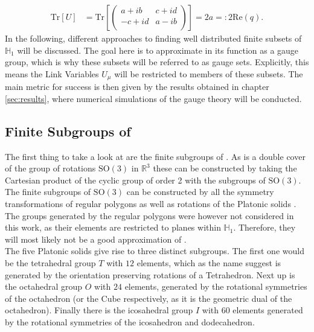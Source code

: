 \begin{align*}
 \mathrm{Tr}\left[ U \right] & = \mathrm{Tr}\left[ \begin{pmatrix}
   a + ib  & c + id \\
   -c + id & a - ib \\
  \end{pmatrix} \right] = 2 a = : 2 \mathrm{Re} (q) \textrm{.}
\end{align*}
In the following, different approaches to finding well distributed finite subsets of $\mathbb{H}_1$ will be discussed. The goal here is to approximate \SUTwo in its function as a gauge group, which is why these subsets will be referred to as gauge sets. Explicitly, this means the Link Variables $U_\mu$ will be restricted to members of these subsets. The main metric for success is then given by the results obtained in chapter \ref{sec:results}, where numerical simulations of the gauge theory will be conducted.

\subsection{Finite Subgroups of \SUTwo}

The first thing to take a look at are the finite subgroups of \SUTwo. As \SUTwo is a double cover of the group of rotations $\mathrm{SO(3)}$ in $\mathbb{R}^3$ these can be constructed by taking the Cartesian product of the cyclic group of order 2 with the subgroups of $\mathrm{SO}(3)$. The finite subgroups of $\mathrm{SO}(3)$ can be constructed by all the symmetry transformations of regular polygons as well as rotations of the Platonic solids \cite{Klein:1880}. The groups generated by the regular polygons were however not considered in this work, as their elements are restricted to planes within $\mathbb{H}_1$. Therefore, they will most likely not be a good approximation of \SUTwo.\\

The five Platonic solids give rise to three distinct subgroups. The first one would be the tetrahedral group $T$ with $12$ elements, which as the name suggest is generated by the orientation preserving rotations of a Tetrahedron. Next up is the octahedral group $O$ with $24$ elements, generated by the rotational symmetries of the octahedron (or the Cube respectively, as it is the geometric dual of the octahedron). Finally there is the icosahedral group $I$ with $60$ elements generated by the rotational symmetries of the icosahedron and dodecahedron.

